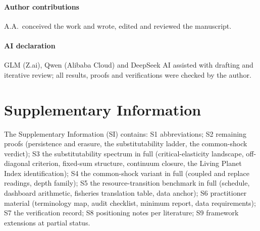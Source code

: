 \documentclass[preprint,11pt,authoryear]{elsarticle}
\theoremstyle{definition}
\theoremstyle{remark}
\begin{document}
\paragraph{Author contributions} A.A.\ conceived the work and wrote, edited and reviewed the manuscript.
\paragraph{AI declaration} GLM (Z.ai), Qwen (Alibaba Cloud) and DeepSeek AI assisted with drafting and iterative review; all results, proofs and verifications were checked by the author.

\section*{Supplementary Information}
The Supplementary Information (SI) contains: S1 abbreviations; S2 remaining proofs (persistence and erasure, the substitutability ladder, the common-shock verdict); S3 the substitutability spectrum in full (critical-elasticity landscape, off-diagonal criterion, fixed-sum structure, continuum closure, the Living Planet Index identification); S4 the common-shock variant in full (coupled and replace readings, depth family); S5 the resource-transition benchmark in full (schedule, dashboard arithmetic, fisheries translation table, data anchor); S6 practitioner material (terminology map, audit checklist, minimum report, data requirements); S7 the verification record; S8 positioning notes per literature; S9 framework extensions at partial status.
\end{document}
